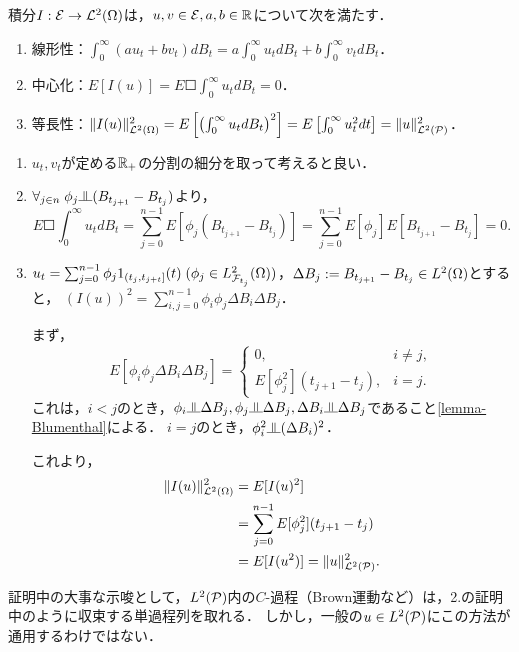 \documentclass[uplatex,dvipdfmx]{jsreport}
\begin{document}
\begin{lemma}[単関数上の積分の性質]\label{lemma-property-of-SI-on-E}
    積分$I:\E\to\L^2(\Om)$は，$u,v\in\E,a,b\in\R$について次を満たす．
    \begin{enumerate}
        \item 線形性：$\int^\infty_0(au_t+bv_t)dB_t=a\int^\infty_0u_tdB_t+b\int^\infty_0v_tdB_t$．
        \item 中心化：$E[I(u)]=E\Square{\int^\infty_0u_tdB_t}=0$．
        \item 等長性：$\norm{I(u)}^2_{\L^2(\Om)}=E\Square{\paren{\int^\infty_0u_tdB_t}^2}=E\Square{\int^\infty_0u^2_tdt}=\norm{u}^2_{\L^2(\P)}$．
    \end{enumerate}
\end{lemma}
\begin{Proof}\mbox{}
    \begin{enumerate}
        \item $u_t,v_t$が定める$\R_+$の分割の細分を取って考えると良い．
        \item $\forall_{j\in n}\;\phi_j\indep (B_{t_{j+1}}-B_{t_j})$より，
        \[E\Square{\int^\infty_0u_tdB_t}=\sum^{n-1}_{j=0}E[\phi_j(B_{t_{j+1}}-B_{t_j})]=\sum^{n-1}_{j=0}E[\phi_j]E[B_{t_{j+1}}-B_{t_j}]=0.\]
        \item $u_t=\sum^{n-1}_{j=0}\phi_j1_{(t_j,t_{j+t}]}(t)\;(\phi_j\in L^2_{\F_{t_j}}(\Om))$，$\Delta B_j:=B_{t_{j+1}}-B_{t_j}\in L^2(\Om)$とすると，
        $(I(u))^2=\sum^{n-1}_{i,j=0}\phi_i\phi_j\Delta B_i\Delta B_j$．

        まず，
        \[E[\phi_i\phi_j\Delta B_i\Delta B_j]=\begin{cases}
            0,&i\ne j,\\
            E[\phi_j^2](t_{j+1}-t_j),&i=j.
        \end{cases}\]
        これは，$i<j$のとき，$\phi_i\indep\Delta B_j,\phi_j\indep\Delta B_j,\Delta B_i\indep\Delta B_j$であること\ref{lemma-Blumenthal}による．
        $i=j$のとき，$\phi^2_i\indep(\Delta B_i)^2$．

        これより，
        \begin{align*}
            \norm{I(u)}^2_{\L^2(\Om)}&=E[I(u)^2]\\
            &=\sum^{n-1}_{j=0}E[\phi_j^2](t_{j+1}-t_j)\\
            &=E[I(u^2)]=\norm{u}^2_{\L^2(\P)}.
        \end{align*}
    \end{enumerate}
\end{Proof}
\begin{remarks}
    証明中の大事な示唆として，$L^2(\P)$内の$C$-過程（Brown運動など）は，2.の証明中のように収束する単過程列を取れる．
    しかし，一般の$u\in L^2(\P)$にこの方法が通用するわけではない．
\end{remarks}
\end{document}
